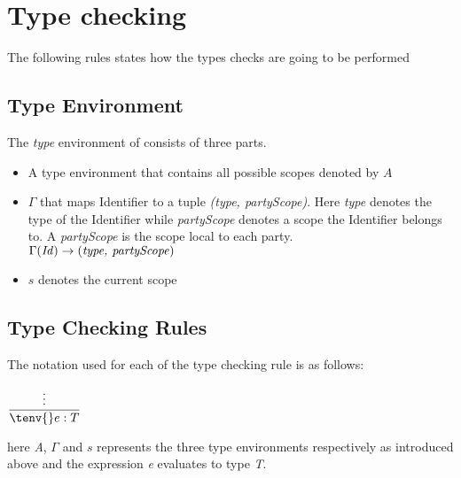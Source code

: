 
\section{Type checking}
The following rules states how the types checks are going to be performed
\subsection{Type Environment} The \textit{type} environment of \langName{} consists of three parts.

\begin{itemize}
    \item A type environment that contains all possible scopes denoted by $A$

    \item $\Gamma$ that maps Identifier to a tuple \textit{(type, partyScope)}. Here \textit{type}
        denotes the type of the Identifier while \textit{partyScope} denotes a scope the Identifier
        belongs to.  A \textit{partyScope} is the scope local to each party.
        \\$\Gamma(\text{\textit{Id}}) \rightarrow (\text{\textit{type, partyScope}})$

    \item $s$ denotes the current scope
\end{itemize}

\subsection{Type Checking Rules}
The notation used for each of the type checking rule is as follows:

\hspace*{10em} $ \dfrac{\vdots}{\tenv{} e: T}$ \smallskip

here \textit{A}, $\Gamma$ and $s$ represents the three
type environments respectively as introduced above and
the expression \textit{e} evaluates to type \textit{T}.\bigskip



